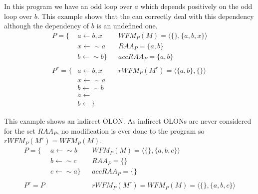 \begin{example}
In this program we have an odd loop over $a$ which depends positively on the odd loop over $b$. This example shows that the \rwfs can correctly deal with this dependency although the dependency of $b$ is an undefined one.
\begin{align*}
P=\{			& a\leftarrow b, x			& 	& WFM_{P}(M)=\langle\{\},\{a,b,x\}\rangle \\
					& x\leftarrow \sim a				& 	& RAA_{P}=\{a,b\}\\
					& b\leftarrow \sim b\}				& 	& accRAA_{P}=\{a,b\}\\
					& 													&		&  \\
P^{r}=\{	& a\leftarrow b, x			& 	& rWFM_{P}(M^{r})=\langle\{a,b\},\{\}\rangle \\
					& x\leftarrow \sim a					& 	&  \\
					& b\leftarrow \sim b					& 	&	 \\
					& a\leftarrow 				&		& \\
					& b\leftarrow \}				&		& 
\end{align*}
\end{example}

\begin{example}
This example shows an indirect OLON. As indirect OLONs are never considered for the set $RAA_{P}$, no modification is ever done to the program so $rWFM_{P}(M^{r}) = WFM_{P}(M)$.
\begin{align*}
P=\{			& a\leftarrow\sim b				& 	& WFM_{P}(M)=\langle\{\},\{a,b,c\}\rangle \\
					& b\leftarrow	\sim c						& 	& RAA_{P}=\{\}\\
					& c\leftarrow \sim a	\}					& 	& accRAA_{P}=\{\}\\
					& 													&		&  \\
P^{r}= P	& 												& 	& rWFM_{P}(M^{r})=WFM_{P}(M)=\langle\{\},\{a,b,c\}\rangle \\
					& & 	&  \\
					& & 	&	 \\
					& &		& 
\end{align*}
\end{example}

